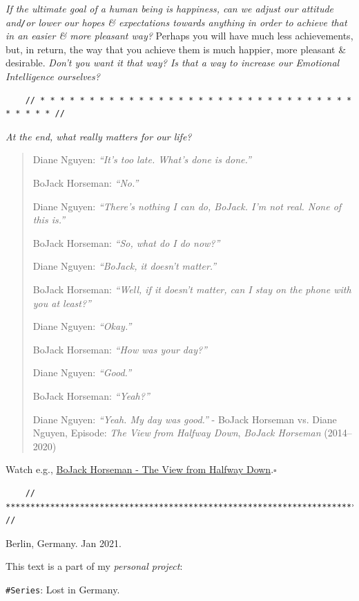 \documentclass[12pt]{article}
\begin{document}
{\it If the ultimate goal of a human being is happiness, can we adjust our attitude and{\tt/}or lower our hopes \& expectations towards anything in order to achieve that in an easier \& more pleasant way?} Perhaps you will have much less achievements, but, in return, the way that you achieve them is much happier, more pleasant \& desirable. {\it Don't you want it that way? Is that a way to increase our Emotional Intelligence ourselves?}

\begin{verbatim}
	// * * * * * * * * * * * * * * * * * * * * * * * * * * * * * * * * * * * * * //
\end{verbatim}

{\it At the end, what really matters for our life?}
\begin{quote}
	Diane Nguyen: {\it ``It's too late. What's done is done.''}
	
	BoJack Horseman: {\it ``No.''}
	
	Diane Nguyen: {\it ``There's nothing I can do, BoJack. I'm not real. None of this is.''}
	
	BoJack Horseman: {\it ``So, what do I do now?''}
	
	Diane Nguyen: {\it ``BoJack, it doesn't matter.''}
	
	BoJack Horseman: {\it ``Well, if it doesn't matter, can I stay on the phone with you at least?''}
	
	Diane Nguyen: {\it ``Okay.''}
	
	BoJack Horseman: {\it ``How was your day?''}
	
	Diane Nguyen: {\it ``Good.''}
	
	BoJack Horseman: {\it ``Yeah?''}
	
	Diane Nguyen: {\it ``Yeah. My day was good.''} - BoJack Horseman vs. Diane Nguyen,  Episode: {\it The View from Halfway Down}, {\it BoJack Horseman} (2014--2020)
\end{quote}
Watch e.g., \href{https://www.youtube.com/watch?v=Pt21dU5Pu8g}{BoJack Horseman - The View from Halfway Down}.\hfill$\square$

\begin{verbatim}
	// ************************************************************************* //
\end{verbatim}

\begin{flushright}
	{\sc Berlin, Germany}. Jan 2021.
	
	This text is a part of my {\it personal project}: 
	
	{\tt \#Series}: {\sc Lost in Germany}.
\end{flushright}
\end{document}
